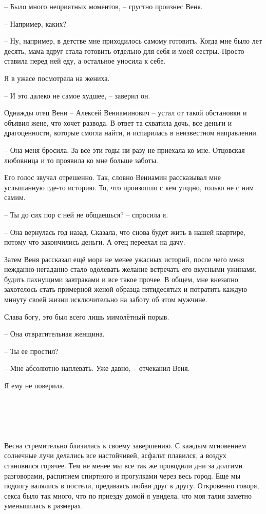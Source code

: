 \documentclass[
]{book}
\begin{document}
-- Было много неприятных моментов, -- грустно произнес Веня.

-- Например, каких?

-- Ну, например, в детстве мне приходилось самому готовить. Когда мне было лет десять, мама вдруг стала готовить отдельно для себя и моей сестры. Просто ставила перед ней еду, а остальное уносила к себе.

Я в ужасе посмотрела на жениха.

-- И это далеко не самое худшее, -- заверил он.

Однажды отец Вени -- Алексей Вениаминович -- устал от такой обстановки и объявил жене, что хочет развода. В ответ та схватила дочь, все деньги и драгоценности, которые смогла найти, и испарилась в неизвестном направлении.

-- Она меня бросила. За все эти годы ни разу не приехала ко мне. Отцовская любовница и то проявила ко мне больше заботы.

Его голос звучал отрешенно. Так, словно Вениамин рассказывал мне услышанную где-то историю. То, что произошло с кем угодно, только не с ним самим.

-- Ты до сих пор с ней не общаешься? -- спросила я.

-- Она вернулась год назад. Сказала, что снова будет жить в нашей квартире, потому что закончились деньги. А отец переехал на дачу.

Затем Веня рассказал ещё море не менее ужасных историй, после чего меня нежданно-негаданно стало одолевать желание встречать его вкусными ужинами, будить пахнущими завтраками и все такое прочее. В общем, мне внезапно захотелось стать примерной женой образца пятидесятых и потратить каждую минуту своей жизни исключительно на заботу об этом мужчине.

Слава богу, это был всего лишь мимолётный порыв.

-- Она отвратительная женщина.

-- Ты ее простил?

-- Мне абсолютно наплевать. Уже давно, -- отчеканил Веня.

Я ему не поверила.

\hypertarget{chapter-20}{%
\chapter{~}\label{chapter-20}}

Весна стремительно близилась к своему завершению. С каждым мгновением солнечные лучи делались все настойчивей, асфальт плавился, а воздух становился горячее. Тем не менее мы все так же проводили дни за долгими разговорами, распитием спиртного и прогулками через весь город. Еще мы подолгу валялись в постели, предаваясь любви друг к другу. Откровенно говоря, секса было так много, что по приезду домой я увидела, что моя талия заметно уменьшилась в размерах.
\end{document}
